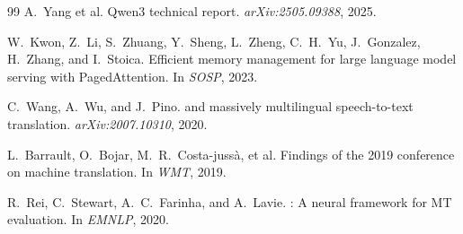 \documentclass{article}
\begin{document}
\begin{thebibliography}{99}
A.~Yang et al.
\newblock Qwen3 technical report.
\newblock \emph{arXiv:2505.09388}, 2025.

W.~Kwon, Z.~Li, S.~Zhuang, Y.~Sheng, L.~Zheng, C.~H.~Yu, J.~Gonzalez,
  H.~Zhang, and I.~Stoica.
\newblock Efficient memory management for large language model serving with
  {PagedAttention}.
\newblock In \emph{SOSP}, 2023.

C.~Wang, A.~Wu, and J.~Pino.
 and massively multilingual speech-to-text translation.
\newblock \emph{arXiv:2007.10310}, 2020.

L.~Barrault, O.~Bojar, M.~R.~Costa-jussà, et al.
\newblock Findings of the 2019 conference on machine translation.
\newblock In \emph{WMT}, 2019.

R.~Rei, C.~Stewart, A.~C.~Farinha, and A.~Lavie.
: A neural framework for {MT} evaluation.
\newblock In \emph{EMNLP}, 2020.

\end{thebibliography}
\end{document}
